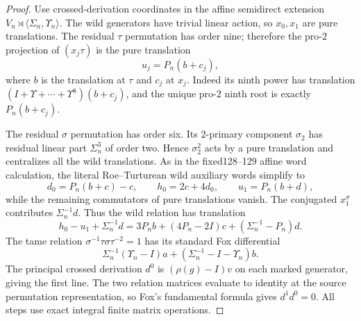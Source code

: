 \begin{proof}
Use crossed-derivation
coordinates in the
affine semidirect
extension
$V_n\rtimes
\langle\Sigma_n,\Upsilon_n\rangle$.
The wild generators
have trivial
linear action,
so $x_0,x_1$
are pure translations.
The residual
$\tau$ permutation
has order nine;
therefore the
pro-$2$ projection
of $(x_j\tau)$
is the pure
translation
\[
u_j=P_n(b+c_j),
\]
where $b$ is the
translation at
$\tau$ and $c_j$
at $x_j$.
Indeed its ninth
power has
translation
$(I+\Upsilon+\cdots+
\Upsilon^8)(b+c_j)$,
and the unique
pro-$2$ ninth root
is exactly $P_n(b+c_j)$.

The residual
$\sigma$ permutation
has order six.
Its $2$-primary
component $\sigma_2$
has residual
linear part
$\Sigma_n^3$
of order two.
Hence
$\sigma_2^2$
acts by a pure
translation and
centralizes all
the wild
translations.
As in the
fixed128--129
affine word
calculation, the
literal Roe--Turturean
wild auxiliary
words simplify to
\[
d_0=P_n(b+c)-c,
\qquad
h_0=2c+4d_0,
\qquad
u_1=P_n(b+d),
\]
while the
remaining commutators
of pure translations
vanish.
The conjugated
$x_1^\sigma$
contributes
$\Sigma_n^{-1}d$.
Thus the
wild relation has
translation
\[
h_0-u_1+\Sigma_n^{-1}d
=3P_nb+(4P_n-2I)c+
(\Sigma_n^{-1}-P_n)d.
\]
The tame relation
$\sigma^{-1}\tau\sigma
\tau^{-2}=1$
has its standard
Fox differential
\[
\Sigma_n^{-1}(\Upsilon_n-I)a+
(\Sigma_n^{-1}-I-\Upsilon_n)b.
\]
The principal
crossed derivation
$d^0$ is
$(\rho(g)-I)v$
on each marked
generator, giving
the first line.
The two relation
matrices evaluate
to identity at
the source
permutation
representation,
so Fox's fundamental
formula gives
$d^1d^0=0$.
All steps
use exact integral
finite matrix
operations.
\end{proof}

